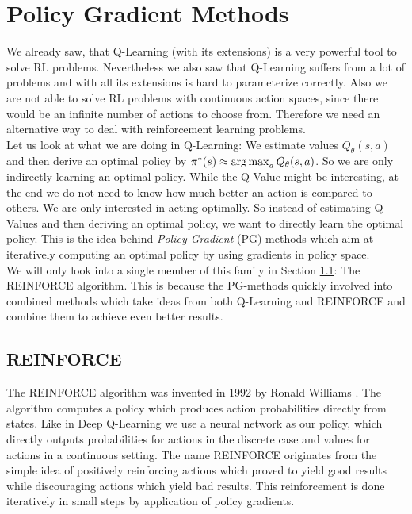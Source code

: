 \section{Policy Gradient Methods} \label{sec:PGMethods}
We already saw, that Q-Learning (with its extensions) is a very powerful tool to solve RL problems. Nevertheless we also saw that Q-Learning suffers from a lot of problems and with all its extensions is hard to parameterize correctly. Also we are not able to solve RL problems with continuous action spaces, since there would be an infinite number of actions to choose from. Therefore we need an alternative way to deal with reinforcement learning problems. \\
Let us look at what we are doing in Q-Learning: We estimate values $Q_\theta(s, a)$ and then derive an optimal policy by $\pi^*(s) \approx \operatorname*{arg\,max}_a Q_\theta(s, a)$. So we are only indirectly learning an optimal policy. While the Q-Value might be interesting, at the end we do not need to know how much better an action is compared to others. We are only interested in acting optimally. So instead of estimating Q-Values and then deriving an optimal policy, we want to directly learn the optimal policy. This is the idea behind \textit{Policy Gradient} (PG) methods which aim at iteratively computing an optimal policy by using gradients in policy space. \\
We will only look into a single member of this family in Section \ref{ssec:REINFORCE}: The REINFORCE algorithm. This is because the PG-methods quickly involved into combined methods which take ideas from both Q-Learning and REINFORCE and combine them to achieve even better results.

\subsection{REINFORCE} \label{ssec:REINFORCE}
The REINFORCE algorithm was invented in 1992 by Ronald Williams \cite{williams1992simple}. The algorithm computes a policy which produces action probabilities directly from states. Like in Deep Q-Learning we use a neural network as our policy, which directly outputs probabilities for actions in the discrete case and values for actions in a continuous setting. The name REINFORCE originates from the simple idea of positively reinforcing actions which proved to yield good results while discouraging actions which yield bad results. This reinforcement is done iteratively in small steps by application of policy gradients.

